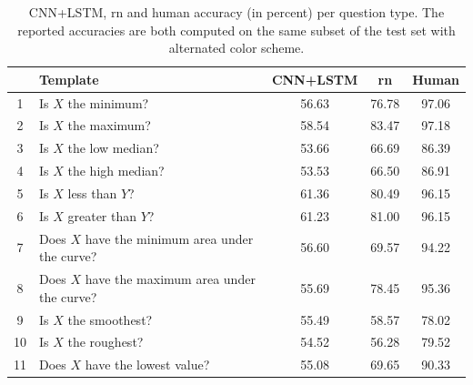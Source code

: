 \documentclass{article} %
\begin{document}
\begin{table}[h]
    \caption{CNN+LSTM, \gls{rn} and human accuracy (in percent) per question type. 
    The reported accuracies are both computed on the same subset of the test set with alternated color scheme.}
    \label{tab:q-type}
    \begin{center}
        \begin{tabular}{clccc}
            \toprule
            {} & Template   & CNN+LSTM & \gls{rn} & Human \\
            \midrule
            1 & Is $X$ the minimum?         & 56.63 & 76.78 %
                                                        & 97.06 \\
            2 & Is $X$ the maximum?         & 58.54 & 83.47 %
                                                        & 97.18 \\
            3 & Is $X$ the low median?      & 53.66 & 66.69 %
                                                        & 86.39 \\
            4 & Is $X$ the high median?     & 53.53 & 66.50 %
                                                        & 86.91 \\
            5 & Is $X$ less than $Y$?       & 61.36 & 80.49 %
                                                        & 96.15 \\
            6 & Is $X$ greater than $Y$?    & 61.23 & 81.00 %
                                                        & 96.15 \\
            7 & Does $X$ have the minimum area under the curve? & 56.60 & 69.57 %
                                                                        & 94.22 \\
            8 & Does $X$ have the maximum area under the curve? & 55.69 & 78.45 %
                                                                        & 95.36 \\
            9 & Is $X$ the smoothest?       & 55.49 & 58.57 %
                                                                        & 78.02 \\
            10 & Is $X$ the roughest?       & 54.52 & 56.28 %
                                                                        & 79.52 \\
            11 & Does $X$ have the lowest value?     & 55.08 & 69.65 %
                                                                        & 90.33 \\

\end{tabular}
\end{center}
\end{table}
\end{document}
